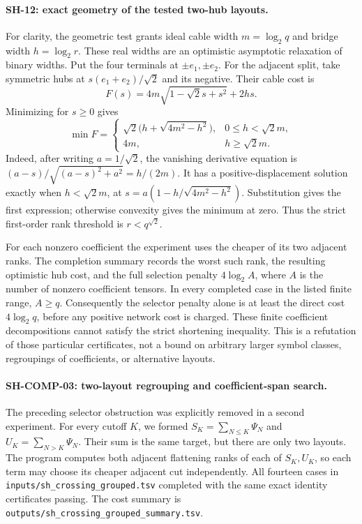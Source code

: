 \paragraph{SH-12: exact geometry of the tested two-hub layouts.}
For clarity, the geometric test grants ideal cable width $m=\log_2 q$
and bridge width $h=\log_2 r$.  These real widths are an optimistic
asymptotic relaxation of binary widths.  Put the four terminals at
$\pm e_1,\pm e_2$.  For the adjacent split, take symmetric hubs at
$s(e_1+e_2)/\sqrt2$ and its negative.  Their cable cost is
\[
 F(s)=4m\sqrt{1-\sqrt2s+s^2}+2hs.
\]
Minimizing for $s\ge0$ gives
\[
 \min F=
 \begin{cases}
 \sqrt2\bigl(h+\sqrt{4m^2-h^2}\bigr),&0\le h<\sqrt2m,\\
 4m,&h\ge\sqrt2m.
 \end{cases}
\]
Indeed, after writing $a=1/\sqrt2$, the vanishing derivative equation
is $(a-s)/\sqrt{(a-s)^2+a^2}=h/(2m)$.  It has a positive-displacement
solution exactly when $h<\sqrt2m$, at
$s=a(1-h/\sqrt{4m^2-h^2})$.  Substitution gives the first expression;
otherwise convexity gives the minimum at zero.  Thus the strict
first-order rank threshold is $r<q^{\sqrt2}$.

For each nonzero coefficient the experiment uses the cheaper of its
two adjacent ranks.  The completion summary records the worst such
rank, the resulting optimistic hub cost, and the full selection
penalty $4\log_2 A$, where $A$ is the number of nonzero coefficient
tensors.  In every completed case in the listed finite range,
$A\ge q$.  Consequently the selector penalty alone is at least the
direct cost $4\log_2 q$, before any positive network cost is charged.
These finite coefficient decompositions cannot satisfy the strict
shortening inequality.  This is a refutation of those particular
certificates, not a bound on arbitrary larger symbol classes,
regroupings of coefficients, or alternative layouts.

\paragraph{SH-COMP-03: two-layout regrouping and coefficient-span search.}
The preceding selector obstruction was explicitly removed in a second
experiment.  For every cutoff $K$, we formed
$S_K=\sum_{N\le K}\Psi_N$ and $U_K=\sum_{N>K}\Psi_N$.  Their sum is
the same target, but there are only two layouts.  The program computes
both adjacent flattening ranks of each of $S_K,U_K$, so each term may
choose its cheaper adjacent cut independently.  All fourteen cases in
\texttt{inputs/sh\_crossing\_grouped.tsv} completed with the same exact
identity certificates passing.  The cost summary is
\texttt{outputs/sh\_crossing\_grouped\_summary.tsv}.

